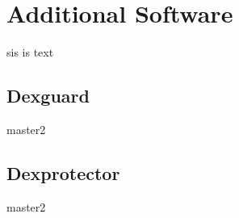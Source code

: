 \section{Additional Software}\label{section:software}
sis is text

\subsection{Dexguard}\label{subsection:software-dexguard}
master2

\subsection{Dexprotector}\label{subsection:software-dexprotector}
master2
